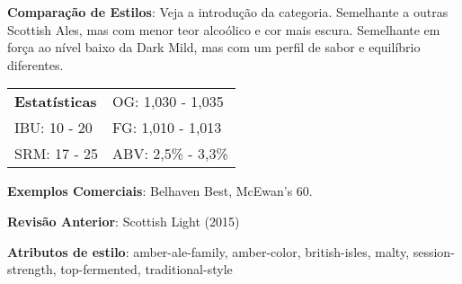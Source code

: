 \textbf{Comparação de Estilos}: Veja a introdução da categoria. Semelhante a outras Scottish Ales, mas com menor teor alcoólico e cor mais escura. Semelhante em força ao nível baixo da Dark Mild, mas com um perfil de sabor e equilíbrio diferentes.

\begin{tabular}{@{}p{35mm}p{35mm}@{}}
  \textbf{Estatísticas} & OG: 1,030 - 1,035 \\
  IBU: 10 - 20  & FG: 1,010 - 1,013  \\
  SRM: 17 - 25  & ABV: 2,5\% - 3,3\%
\end{tabular}

\textbf{Exemplos Comerciais}: Belhaven Best, McEwan's 60.

\textbf{Revisão Anterior}: Scottish Light (2015)

\textbf{Atributos de estilo}: amber-ale-family, amber-color, british-isles, malty, session-strength, top-fermented, traditional-style